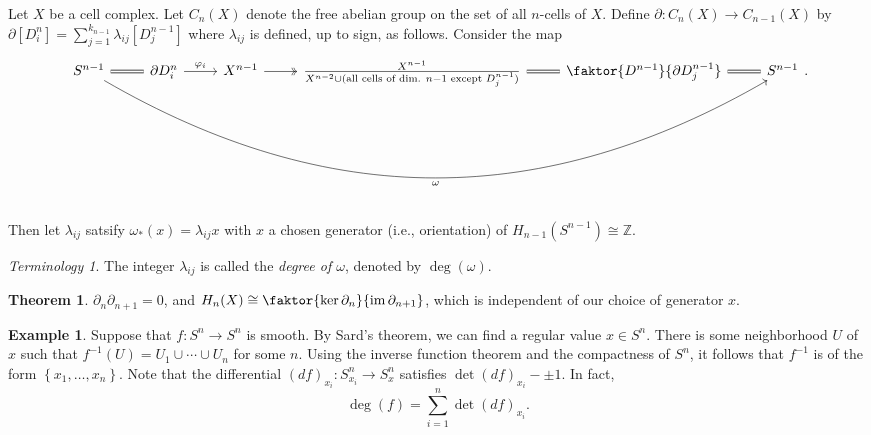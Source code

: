 \documentclass[10pt,letterpaper,cm]{nupset}
\theoremstyle{definition}
\newtheorem{exmp}[defn]{Example}
\theoremstyle{theorem}
\newtheorem{theorem}[defn]{Theorem}
\theoremstyle{remark}
\newtheorem*{term}{Terminology}
\newcommand{\Z}{\mathbb Z}
\newcommand{\1}{\mathbb{1}}
\newcommand{\0}{\vec 0}
\DeclareMathOperator{\im}{im}
\begin{document}
Let $X$ be a cell complex. Let $C_n(X)$ denote the free abelian group on the set of all $n$-cells of $X$. Define $\partial : C_n(X) \to C_{n-1}(X)$ by $\partial[D_i^n] = \sum_{j=1}^{k_{n-1}} \lambda_{ij}[D_j^{n-1}]$ where $\lambda_{ij}$ is defined, up to sign, as follows. Consider the map
\[
\begin{tikzcd}
S^{n-1} \arrow[r, equals] \arrow[rrrrr, "\omega"', bend right] & \partial{D_i^n} \arrow[r, "\varphi_i"] & X^{n-1} \arrow[r, two heads] & \frac{X^{n-1}}{X^{n-2} \cup (\text{all cells of dim. } n-1 \text{ except } D_j^{n-1})} \arrow[r, equals] & \faktor{D^{n-1}}{\partial{D_j^{n-1}}} \arrow[r, equals] & S^{n-1}
\end{tikzcd}
.\]
 Then let $\lambda_{ij}$ satsify $\omega_{\ast}(x) = \lambda_{ij}x$ with $x$ a chosen generator (i.e., orientation) of $H_{n-1}(S^{n-1}) \cong \Z$. 

\begin{term}
The integer $\lambda_{ij}$ is called the \textit{degree of $\omega$}, denoted by $\deg(\omega)$.
\end{term}

\begin{theorem}
$\partial_n{\partial_{n+1}} = 0$, and $H_n(X) \cong \faktor{\ker{\partial_n}}{\im{\partial_{n+1}}}$, which is independent of our choice of generator $x$.
\end{theorem}

\begin{exmp}
Suppose that $f: S^n \to S^n$ is smooth. By Sard's theorem, we can find a regular value $x \in S^n$. There is some neighborhood $U$ of $x$ such that $f^{-1}(U) = U_1 \cup \cdots \cup U_n$ for some $n$. Using the inverse function theorem and the compactness of $S^n$, it follows that $f^{-1}$ is of the form $\left\{x_1, \ldots, x_n\right\}$. Note that the differential $\left(d{f}\right)_{x_i} : S^n_{x_i} \to S^n_x$ satisfies $\det{(d{f})_{x_i}} - \pm 1$. In fact, $$\deg(f) = \sum_{i=1}^n \det{(d{f})_{x_i}}.$$
\end{exmp}
\end{document}
